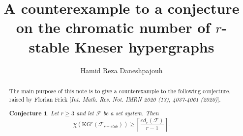 \documentclass[preprint,12pt,3p]{elsarticle}
\newtheorem*{conjecture*}{Conjecture}
\begin{document}
\begin{frontmatter}

\title{A counterexample to a conjecture on the chromatic number of $r$-stable Kneser hypergraphs}






\author[label1]{Hamid Reza Daneshpajouh}
\address[label1]{
University of Nottingham Ningbo China, 199 Taikang E Rd, Yinzhou, Ningbo, Zhejiang, China, 315104}


\begin{abstract}
The main purpose of this note is to give a counterexample to the following conjecture, raised by Florian Frick [\textit{Int. Math. Res. Not. IMRN 2020 (13), 4037-4061 (2020)}].
\begin{conjecture*}
 Let $r\geq 3$ and let $\mathcal{F}$ be a set system. Then
 $$\chi\left(\textrm{KG}^r\left(\mathcal{F}_{r-stab}\right)\right)\geq\left\lceil\frac{cd_r\left(\mathcal{F}\right)}{r-1}\right\rceil.$$
\end{conjecture*}


\end{abstract}

\end{frontmatter}
\end{document}
